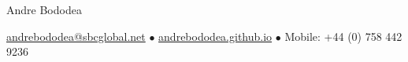 \documentclass{article}
\begin{document}
%
%
\begin{center}
\huge{Andre Bododea}\\
\end{center}
	 	

\vspace{2mm} %
\begin{minipage}[t]{1\textwidth}
\hangindent=2.5cm
\hspace{1.4cm}\href{mailto:andrebododea@sbcglobal.net}{andrebododea@sbcglobal.net}   \hspace{0.25cm} $\bullet$ \hspace{0.25cm}   \href{https://andrebododea.github.io}{andrebododea.github.io}   \hspace{0.25cm} $\bullet$ \hspace{0.25cm}   Mobile: +44 (0) 758 442 9236\\
\end{minipage}	
\end{document}
